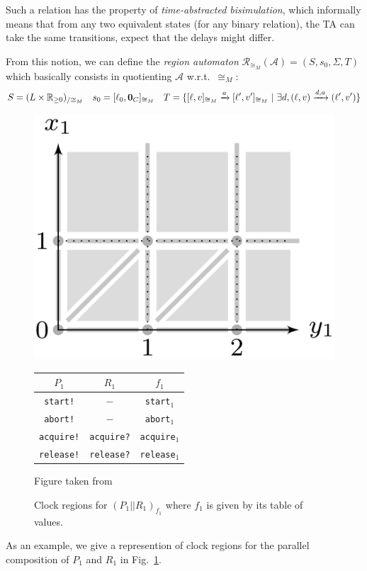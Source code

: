 \documentclass[11pt]{article}
\theoremstyle{definition}
\theoremstyle{remark}
\begin{document}
Such a relation has the property of \emph{time-abstracted bisimulation}, which informally means that from any two equivalent states (for any binary  relation), the TA can take the same transitions, expect that the delays might differ.

From this notion, we can define the \emph{region automaton} $\mathcal{R}_{\cong_M}(\mathcal{A}) = (S, s_0, \Sigma, T)$ which basically consists in quotienting $\mathcal{A}$ w.r.t.\ $\cong_M$:
$$
S = (L \times \mathbb{R}_{\geq 0})_{/\cong_M} \quad
s_0 = [\ell_0, \text{\bf 0}_C]_{\cong_M} \quad
T = \{ [\ell, v]_{\cong_M} \xrightarrow{a} [\ell', v']_{\cong_M}\ | \ \exists d, (\ell, v) \xrightarrow{d, a} (\ell', v')\}
$$

\begin{figure}[ht]
	\centering
	\includegraphics[width=.25\textwidth]{../img/TAreg.png}
	\qquad
	\begin{tabular}[b]{c|c||c}\hline
	$P_1$ & $R_1$ & $f_1$\\
	\hline
	\hline
	\texttt{start!} & $-$ & \texttt{start}$_1$ \\ \hline
	\texttt{abort!} & $-$ & \texttt{abort}$_1$ \\ \hline
	\texttt{acquire!} & \texttt{acquire?} & \texttt{acquire}$_1$ \\ \hline
	\texttt{release!} & \texttt{release?} & \texttt{release}$_1$ \\ \hline
	\end{tabular}
	\caption{Clock regions for $(P_1 || R_1)_{f_1}$ where $f_1$ is given by its table of values.}\label{fig:ta_reg}
	{\tiny Figure taken from \cite[Chapter 29.3]{handbook}}
	\end{figure}
	

As an example, we give a represention of clock regions for the parallel composition of $P_1$ and $R_1$ in Fig.~\ref{fig:ta_reg}.



\end{document}
